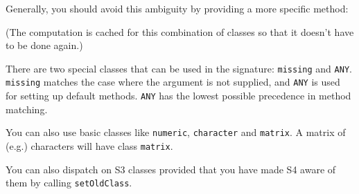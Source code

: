 Generally, you should avoid this ambiguity by providing a more specific
method:

\begin{Shaded}
\begin{Highlighting}[]
\NormalTok{(}\NormalTok{, }\NormalTok{(}\NormalTok{, }\NormalTok{), }\NormalTok{)}
\NormalTok{(}\NormalTok{(}\NormalTok{), }\NormalTok{(}\NormalTok{))}
\end{Highlighting}
\end{Shaded}

(The computation is cached for this combination of classes so that it
doesn't have to be done again.)

There are two special classes that can be used in the signature:
\texttt{missing} and \texttt{ANY}. \texttt{missing} matches the case
where the argument is not supplied, and \texttt{ANY} is used for setting
up default methods. \texttt{ANY} has the lowest possible precedence in
method matching.

You can also use basic classes like \texttt{numeric}, \texttt{character}
and \texttt{matrix}. A matrix of (e.g.) characters will have class
\texttt{matrix}.

\begin{Shaded}
\begin{Highlighting}[]
\NormalTok{(}\NormalTok{, }\NormalTok{(}\NormalTok{))}
\NormalTok{(}\NormalTok{, }\NormalTok{(}\NormalTok{), }\NormalTok{)}
\NormalTok{(}\NormalTok{, }\NormalTok{(}\NormalTok{), }\NormalTok{)}
    
\NormalTok{(} \NormalTok{))}
\end{Highlighting}
\end{Shaded}

You can also dispatch on S3 classes provided that you have made S4 aware
of them by calling \texttt{setOldClass}.

